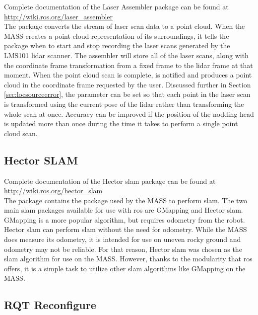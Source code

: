 Complete documentation of the Laser Assembler package can be found at \url{http://wiki.ros.org/laser_assembler}\\

The  package converts the stream of laser scan data to a point cloud. When the MASS creates a point cloud representation of its surroundings, it tells the  package when to start and stop recording the laser scans generated by the LMS101 \acrshort{lidar} scanner. The assembler will store all of the laser scans, along with the coordinate frame transformation from a fixed frame to the \acrshort{lidar} frame at that moment. When the point cloud scan is complete,  is notified and produces a point cloud in the coordinate frame requested by the user. Discussed further in Section \ref{sec:locsourceerror}, the parameter  can be set so that each point in the laser scan is transformed using the current pose of the \acrshort{lidar} rather than transforming the whole scan at once. Accuracy can be improved if the position of the nodding head is updated more than once during the time it takes to perform a single point cloud scan.\\

\subsection{Hector SLAM}

Complete documentation of the Hector \acrshort{slam} package can be found at \url{http://wiki.ros.org/hector_slam}\\

The  package contains the  package used by the MASS to perform \acrshort{slam}. The two main \acrshort{slam} packages available for use with \acrshort{ros} are GMapping and Hector \acrshort{slam}. GMapping is a more popular algorithm, but requires odometry from the robot. Hector \acrshort{slam} can perform \acrshort{slam} without the need for odometry. While the MASS does measure its odometry, it is intended for use on uneven rocky ground and odometry may not be reliable. For that reason, Hector \acrshort{slam} was chosen as the \acrshort{slam} algorithm for use on the MASS. However, thanks to the modularity that \acrshort{ros} offers, it is a simple task to utilize other \acrshort{slam} algorithms like GMapping on the MASS.\\

\subsection{RQT Reconfigure}

